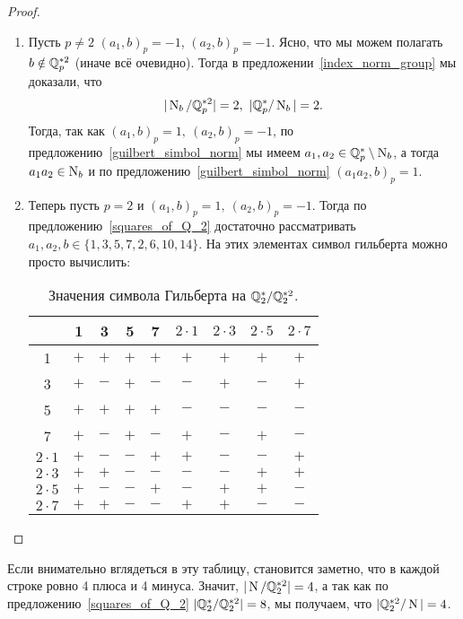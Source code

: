 \begin{proof}
\begin{enumerate}
			 \item Пусть $p \neq 2$  $(a_1, b)_{p} = -1$, $(a_2, b)_{p} = -1$. Ясно, что мы можем полагать $b \notin \mathbb{Q}_{p}^{*2}$ (иначе всё очевидно). Тогда в предложении~\ref{index_norm_group} мы доказали, что 
			 \[
			  	|\Nm_{b}/\Q_{p}^{*2}| = 2, \ |\Q_{p}^{*}/\Nm_{b}| = 2.
			  \] 
			  Тогда, так как $(a_1, b)_{p} = 1, \ (a_{2}, b)_{p} = -1$, по предложению~\ref{guilbert_simbol_norm} мы имеем $a_1, a_2 \in \mathbb{Q}_{p}^{*} \setminus \operatorname{\mathrm{N}}_{b}$, а тогда $a_1 a_2 \in \operatorname{\mathrm{N}}_{b}$ и по предложению~\ref{guilbert_simbol_norm} $(a_1 a_2, b)_{p} = 1$. 
			  \item Теперь пусть $p = 2$ и $(a_1, b)_{p} = 1, \ (a_{2}, b)_{p} = -1$. Тогда по предложению~\ref{squares_of_Q_2} достаточно рассматривать $a_1, a_2, b \in \{ 1, 3, 5, 7, 2, 6, 10, 14 \}$. На этих элементах символ гильберта можно просто вычислить: 
			  \begin{table}
			    \centering
			    \begin{tabular}{c|c|c|c|c|c|c|c|c}
			         & 1 & 3 & 5 & 7 & $2 \cdot 1$ & $2\cdot 3$ & $2 \cdot 5$ & $2 \cdot 7$ \\ \hline
			         1 & $+$ & $+$ & $+$ & $+$ & $+$ & $+$ & $+$ & $+$\\ \hline
			         3 & $+$ & $-$ & $+$ & $-$ & $-$ & $+$ & $-$ & $+$ \\ \hline
			         5 & $+$ & $+$ & $+$ & $+$ & $-$ & $-$ & $-$ & $-$ \\ \hline
			         7 & $+$ & $-$ & $+$ & $-$ & $+$ & $-$ & $+$ & $-$ \\ \hline
			         $2 \cdot 1$ & $+$ & $-$ & $-$ & $+$ & $+$ & $-$ & $-$ & $+$\\ \hline
			         $2 \cdot 3$ & $+$ & $+$ & $-$ & $-$ & $-$ & $-$ & $+$ & $+$\\ \hline
			         $2 \cdot 5$ & $+$ & $-$ & $-$ & $+$ & $-$ & $+$ & $+$ & $-$\\ \hline
			         $2 \cdot 7$ & $+$ & $+$ & $-$ & $-$ & $+$ & $+$ & $-$ & $-$\\ 
			    \end{tabular}
			    \caption{Значения символа Гильберта на $\mathbb{Q}_{2}^{*}/\mathbb{Q}_{2}^{*2}$.}
			    \label{tab:guilbert_Q_2}
			\end{table}

		\end{enumerate}
		\end{proof}

		\begin{remark}
			Если внимательно вглядеться в эту таблицу, становится заметно, что в каждой строке ровно 4 плюса и 4 минуса. Значит, $|\operatorname{\mathrm{N}}/\mathbb{Q}_{2}^{*2}| = 4$, а так как по предложению~\ref{squares_of_Q_2} $|\mathbb{Q}_{2}^{*}/\mathbb{Q}_{2}^{*2}| = 8$, мы получаем, что $|\mathbb{Q}_{2}^{*2}/\operatorname{\mathrm{N}}| = 4$. 
		\end{remark}

